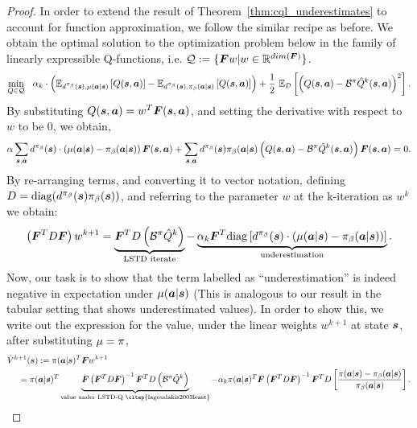 \begin{proof} 
In order to extend the result of Theorem~\ref{thm:cql_underestimates} to account for function approximation, we follow the similar recipe as before. We obtain the optimal solution to the optimization problem below in the family of linearly expressible Q-functions, i.e. $\mathcal{Q} := \{\boldsymbol{F} w | w \in \mathbb{R}^{dim(\boldsymbol{F})} \}$. 
\begin{equation*}
    \min_{Q \in \mathcal{Q}}~~ \alpha_k \cdot \left(\mathbb{E}_{d^{\pi_\beta}(\boldsymbol{s}),\mu(\boldsymbol{a}|\boldsymbol{s})}\left[Q(\boldsymbol{s}, \boldsymbol{a})\right] - {\mathbb{E}_{d^{\pi_\beta}(\boldsymbol{s}),{\pi_\beta}(\boldsymbol{a}|\boldsymbol{s})}\left[Q(\boldsymbol{s}, \boldsymbol{a})\right]} \right) + \frac{1}{2}~ \mathbb{E}_{\mathcal{D}}\left[\left(Q(\boldsymbol{s}, \boldsymbol{a}) - \mathcal{B}^\pi \hat{Q}^{k} (\boldsymbol{s}, \boldsymbol{a}) \right)^2 \right].
\end{equation*}
By substituting $Q(\boldsymbol{s}, \boldsymbol{a}) = w^T \boldsymbol{F}(\boldsymbol{s}, \boldsymbol{a})$, and setting the derivative with respect to $w$ to be 0, we obtain,
\begin{align*}
    \alpha \sum_{\boldsymbol{s}, \boldsymbol{a}} d^{\pi_\beta}(\boldsymbol{s}) \cdot \left( \mu(\boldsymbol{a}|\boldsymbol{s}) - {\pi_\beta}(\boldsymbol{a}|\boldsymbol{s}) \right) \boldsymbol{F}(\boldsymbol{s}, \boldsymbol{a}) + \sum_{\boldsymbol{s}, \boldsymbol{a}} d^{\pi_\beta}(\boldsymbol{s}) {\pi_\beta}(\boldsymbol{a}|\boldsymbol{s}) \left( Q(\boldsymbol{s}, \boldsymbol{a}) - \mathcal{B}^\pi \hat{Q}^k(\boldsymbol{s}, \boldsymbol{a}) \right) \boldsymbol{F}(\boldsymbol{s}, \boldsymbol{a}) = 0.
\end{align*}
By re-arranging terms, and converting it to vector notation, defining $D = \text{diag}(d^{\pi_\beta}(\boldsymbol{s}){\pi_\beta}(\boldsymbol{s}))$, and referring to the parameter $w$ at the k-iteration as $w^k$ we obtain:
\begin{align*}
    \left(\boldsymbol{F}^T D \boldsymbol{F} \right) w^{k+1} = \underbrace{\boldsymbol{F}^T D \left( \mathcal{B}^\pi \hat{Q}^k \right)}_{\text{LSTD iterate}} - \underbrace{\alpha_k \boldsymbol{F}^T \text{diag}\left[d^{\pi_\beta}(\boldsymbol{s}) \cdot(\mu(\boldsymbol{a}|\boldsymbol{s}) - {\pi_\beta}(\boldsymbol{a}|\boldsymbol{s})) \right]}_{\text{underestimation}}.
\end{align*}
Now, our task is to show that the term labelled as ``underestimation'' is indeed negative in expectation under $\mu(\boldsymbol{a}|\boldsymbol{s})$ (This is analogous to our result in the tabular setting that shows underestimated values). In order to show this, we write out the expression for the value, under the linear weights $w^{k+1}$ at state $\boldsymbol{s}$, after substituting $\mu = \pi$,
\begin{align}
    \hat{V}^{k+1}(\bs) &:= \policy(\mathbf{a}|\bs)^T \Qfeat w^{k+1}\\
    = \policy(&\mathbf{a}|\bs)^T \underbrace{\Qfeat \left(\Qfeat^T D \Qfeat \right)^{-1} \Qfeat^T D \left(\bellman^\policy \hat{Q}^k \right)}_{\text{value under LSTD-Q~\citep{lagoudakis2003least}}} - \alpha_k \policy(\mathbf{a}|\bs)^T \Qfeat \left(\Qfeat^T D \Qfeat \right)^{-1} \Qfeat^T D \left[\frac{\policy(\mathbf{a}|\bs) - \behavior(\mathbf{a}|\bs)}{\behavior(\mathbf{a}|\bs)} \right].

\end{align}
\end{proof}
